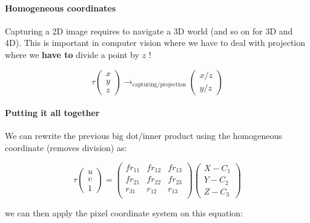 \documentclass[
  a4paper,
  ,captions=tableheading
]{scrartcl}
\begin{document}
\paragraph{Homogeneous coordinates}\label{homogeneous-coordinates}

Capturing a 2D image requires to navigate a 3D world (and so on for 3D
and 4D). This is important in computer vision where we have to deal with
projection where we \textbf{have to} divide a point by \(z\) !

\[
\tau \begin{pmatrix}
    x\\ y\\ z
\end{pmatrix} \rightarrow_{\text{capturing/projection}} \begin{pmatrix}
    x/z\\ y/z
\end{pmatrix}
\]

\paragraph{Putting it all together}\label{putting-it-all-together}

We can rewrite the previous big dot/inner product using the homogeneous
coordinate (removes division) as:

\[
\tau \begin{pmatrix}
    u\\ v\\ 1
\end{pmatrix} = \begin{pmatrix}
    fr_{11} & fr_{12} & fr_{13} \\
    fr_{21} & fr_{22} & fr_{23} \\
    r_{31} & r_{12} & r_{13} \\
\end{pmatrix} \begin{pmatrix}
    X-C_1\\ Y-C_2 \\ Z-C_3
\end{pmatrix}
\]

we can then apply the pixel coordinate system on this equation:
\end{document}
